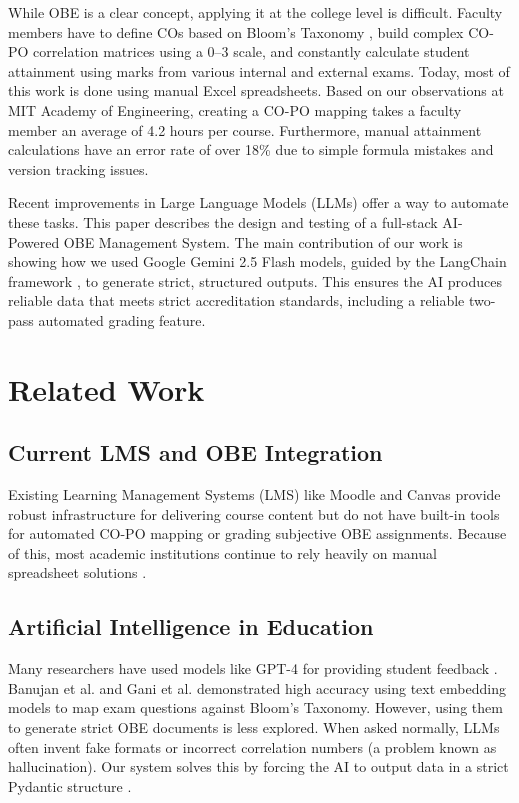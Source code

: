 \documentclass[conference]{IEEEtran}
\begin{document}
While OBE is a clear concept, applying it at the college level is difficult. Faculty members have to define COs based on Bloom’s Taxonomy \cite{bloom1956, anderson2001}, build complex CO-PO correlation matrices using a 0–3 scale, and constantly calculate student attainment using marks from various internal and external exams. Today, most of this work is done using manual Excel spreadsheets. Based on our observations at MIT Academy of Engineering, creating a CO-PO mapping takes a faculty member an average of 4.2 hours per course. Furthermore, manual attainment calculations have an error rate of over 18\% due to simple formula mistakes and version tracking issues.

Recent improvements in Large Language Models (LLMs) offer a way to automate these tasks. This paper describes the design and testing of a full-stack AI-Powered OBE Management System. The main contribution of our work is showing how we used Google Gemini 2.5 Flash models, guided by the LangChain framework \cite{langchain2022}, to generate strict, structured outputs. This ensures the AI produces reliable data that meets strict accreditation standards, including a reliable two-pass automated grading feature.

\section{Related Work}

\subsection{Current LMS and OBE Integration}
Existing Learning Management Systems (LMS) like Moodle \cite{dougiamas2003} and Canvas provide robust infrastructure for delivering course content but do not have built-in tools for automated CO-PO mapping or grading subjective OBE assignments. Because of this, most academic institutions continue to rely heavily on manual spreadsheet solutions \cite{kothari2004}. 

\subsection{Artificial Intelligence in Education}
Many researchers have used models like GPT-4 for providing student feedback \cite{openai2023, kasneci2023, mdpi2024}. Banujan et al. \cite{banujan2023} and Gani et al. \cite{gani2022} demonstrated high accuracy using text embedding models to map exam questions against Bloom's Taxonomy. However, using them to generate strict OBE documents is less explored. When asked normally, LLMs often invent fake formats or incorrect correlation numbers (a problem known as hallucination). Our system solves this by forcing the AI to output data in a strict Pydantic structure \cite{arxiv2024structured}.
\end{document}
